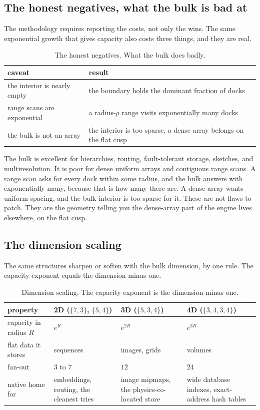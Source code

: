\subsection{The honest negatives, what the bulk is bad at}

The methodology requires reporting the costs, not only the wins. The same exponential growth that gives capacity also costs three things, and they are real.

\begin{table}[ht]
\centering
\begin{tabular}{@{}ll@{}}
\toprule
caveat & result \\
\midrule
the interior is nearly empty & the boundary holds the dominant fraction of docks \\
range scans are exponential & a radius-$\rho$ range visits exponentially many docks \\
the bulk is not an array & the interior is too sparse, a dense array belongs on the flat cusp \\
\bottomrule
\end{tabular}
\caption{The honest negatives. What the bulk does badly.}
\label{tab:negatives}
\end{table}

The bulk is excellent for hierarchies, routing, fault-tolerant storage, sketches, and multiresolution. It is poor for dense uniform arrays and contiguous range scans. A range scan asks for every dock within some radius, and the bulk answers with exponentially many, because that is how many there are. A dense array wants uniform spacing, and the bulk interior is too sparse for it. These are not flaws to patch. They are the geometry telling you the dense-array part of the engine lives elsewhere, on the flat cusp.

\subsection{The dimension scaling}

The same structures sharpen or soften with the bulk dimension, by one rule. The capacity exponent equals the dimension minus one.

\begin{table}[ht]
\centering
\begin{tabular}{@{}llll@{}}
\toprule
property & 2D ($\{7,3\}$, $\{5,4\}$) & 3D ($\{5,3,4\}$) & 4D ($\{3,4,3,4\}$) \\
\midrule
capacity in radius $R$ & $e^{R}$ & $e^{2R}$ & $e^{3R}$ \\
flat data it stores & sequences & images, grids & volumes \\
fan-out & $3$ to $7$ & $12$ & $24$ \\
native home for & embeddings, routing, the cleanest tries & image mipmaps, the physics-co-located store & wide database indexes, exact-address hash tables \\
\bottomrule
\end{tabular}
\caption{Dimension scaling. The capacity exponent is the dimension minus one.}
\label{tab:dimension-scaling}
\end{table}

